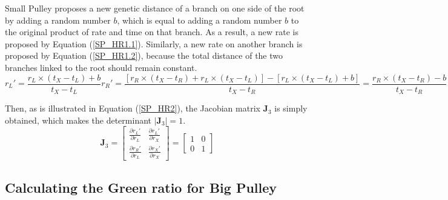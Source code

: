 \documentclass{bmcart}
\begin{document}
\begin{backmatter}
Small Pulley proposes a new genetic distance of a branch on one side of the root by adding a random number $b$, which is equal to adding a random number $b$ to the original product of rate and time on that branch. As a result, a new rate is proposed by Equation (\ref{SP_HR1.1}). Similarly, a new rate on another branch is proposed by Equation (\ref{SP_HR1.2}), because the total distance of the two branches linked to the root should remain constant.
\begin{subequations}\label{SP_HR1}
\begin{equation}\label{SP_HR1.1}
{r_L}' = \frac{{{r_L} \times ({t_X} - {t_L}) + b}}{{{t_X} - {t_L}}}
\end{equation}
\begin{equation}\label{SP_HR1.2}
{r_R}' = \frac{{[{r_R} \times ({t_X} - {t_R}) + {r_L} \times ({t_X} - {t_L})] - [{r_L} \times ({t_X} - {t_L}) + b]}}{{{t_X} - {t_R}}} = \frac{{{r_R} \times ({t_X} - {t_R}) - b}}{{{t_X} - {t_R}}}
\end{equation}
\end{subequations}

Then, as is illustrated in Equation (\ref{SP_HR2}), the Jacobian matrix ${{\mathbf{J}}_3}$ is simply obtained, which makes the determinant $\left| {{{\mathbf{J}}_3}} \right| = 1$.
\begin{equation}\label{SP_HR2}
{{\mathbf{J}}_3} = \left[ {\begin{array}{*{20}{c}}
  {\frac{{\partial {r_L}'}}{{\partial {r_L}}}}&{\frac{{\partial {r_L}'}}{{\partial {r_X}}}} \\
  {\frac{{\partial {r_R}'}}{{\partial {r_L}}}}&{\frac{{\partial {r_X}'}}{{\partial {r_X}}}}
\end{array}} \right] = \left[ {\begin{array}{*{20}{c}}
  1&0 \\
  0&1
\end{array}} \right]
\end{equation}
\subsection*{Calculating the Green ratio for Big Pulley}


\end{backmatter}
\end{document}
